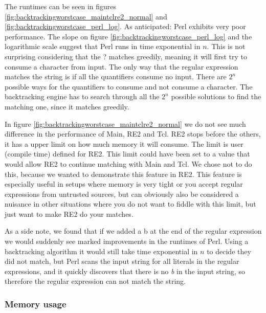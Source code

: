 The runtimes can be seen in figures
\ref{fig:backtrackingworstcase_maintclre2_normal} and
\ref{fig:backtrackingworstcase_perl_log}. As anticipated: Perl
exhibits very poor performance. The slope on figure
\vref{fig:backtrackingworstcase_perl_log} and the logarithmic scale
suggest that Perl runs in time exponential in $n$. This is not
surprising considering that the \textsf{?} matches greedily,
meaning it will first try to consume a character from input. The only
way that the regular expression matches the string is if all the
quantifiers consume no input. There are $2^n$ possible ways for the
quantifiers to consume and not consume a character. The backtracking
engine has to search through all the $2^n$ possible solutions to find
the matching one, since it matches greedily.

In figure \vref{fig:backtrackingworstcase_maintclre2_normal} we do not
see much difference in the performance of Main, RE2 and Tcl. RE2 stops
before the others, it has a upper limit on how much memory it will
consume. The limit is user (compile time) defined for RE2. This limit could have been set to a value that would allow
RE2 to continue matching with Main and Tcl. We chose not to do this,
because we wanted to demonstrate this feature in RE2. This feature is
especially useful in setups where memory is very tight or you accept
regular expressions from untrusted sources, but can obviously also be considered a
nuisance in other situations where you do not want to fiddle with this
limit, but just want to make RE2 do your matches.

As a side note, we found that if we added a \textsf{b} at the end of
the regular expression we would suddenly see marked improvements in
the runtimes of Perl. Using a backtracking algorithm it would still
take time exponential in $n$ to decide they did not match, but Perl
scans the input string for all literals in the regular expressions,
and it quickly discovers that there is no \textsl{b} in the input
string, so therefore the regular expression can not match the
string. 


\subsubsection{Memory usage}

